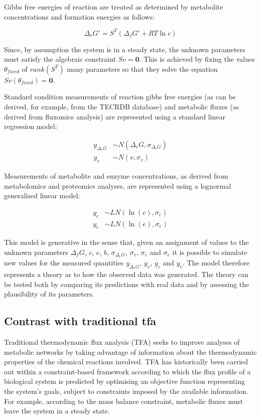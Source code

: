 \documentclass[11pt]{article}
\begin{document}
Gibbs free energies of reaction are treated as determined by metabolite
concentrations and formation energies as follows:

\[
\Delta_rG' = S^T(\Delta_fG' + RT\ln c)
\]

Since, by assumption the system is in a steady state, the unknown parameters
must satisfy the algebraic constraint $Sv = \mathbf{0}$. This is achieved by
fixing the values $\theta_{fixed}$ of $rank(S^T)$ many parameters so that they
solve the equation $Sv(\theta_{fixed}) = \mathbf{0}$.

Standard condition measurements of reaction gibbs free energies (as can be
derived, for example, from the TECRDB database) and metabolic fluxes (as
derived from fluxomics analysis) are represented using a standard linear
regression model:

\begin{align*}
	y_{\Delta_rG} &\sim N(\Delta_rG, \sigma_{\Delta_rG}) \\
	y_{v} &\sim N(v, \sigma_{v})
\end{align*}

Measurements of metabolite and enzyme concentrations, as derived from
metabolomics and proteomics analyses, are represented using a lognormal
generalised linear model:

\begin{align*}
	y_{c} & \sim LN(\ln(c), \sigma_{c}) \\
	y_{e} & \sim LN(\ln(e), \sigma_{e})
\end{align*}

This model is generative in the sense that, given an assignment of values to
the unknown parameters $\Delta_fG$, $c$, $e$, $b$, $\sigma_{\Delta_rG}$,
$\sigma_{v}$, $\sigma_c$ and $\sigma_{e}$ it is possible to simulate new values
for the measured quantities $y_{\Delta_rG}$, $y_v$, $y_c$ and $y_e$. The model
therefore represents a theory as to how the observed data was generated. The
theory can be tested both by comparing its predictions with real data and by
assessing the plausibility of its parameters.

\subsection{Contrast with traditional tfa}

Traditional thermodynamic flux analysis (TFA) seeks to improve analyses of
metabolic networks by taking advantage of information about the thermodynamic
properties of the chemical reactions involved. TFA has historically been
carried out within a constraint-based framework according to which the flux
profile of a biological system is predicted by optimising an objective function
representing the system's goals, subject to constraints imposed by the
available information. For example, according to the mass balance constraint,
metabolic fluxes must leave the system in a steady state.
\end{document}
